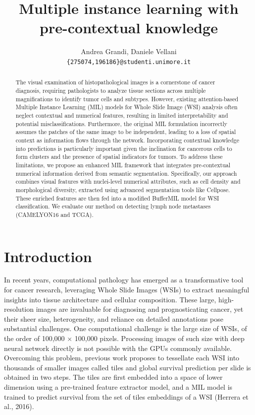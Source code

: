 \documentclass[10pt,twocolumn]{article}
\title{\textbf{Multiple instance learning with pre-contextual knowledge}}
\author{Andrea Grandi, Daniele Vellani \\
\texttt{\{275074,196186\}@studenti.unimore.it}}
\begin{document}
\maketitle

\begin{abstract}
\noindent 
The visual examination of histopathological images is a cornerstone of cancer diagnosis, requiring pathologists to analyze tissue sections across multiple magnifications to identify tumor cells and subtypes. However, existing attention-based Multiple Instance Learning (MIL) models for Whole Slide Image (WSI) analysis often neglect contextual and numerical features, resulting in limited interpretability and potential misclassifications. Furthermore, the original MIL formulation incorrectly assumes the patches of the same image to be independent, leading to a loss of spatial context as information flows through the network. Incorporating contextual knowledge into predictions is particularly important given the inclination for cancerous cells to form clusters and the presence of spatial indicators for tumors. To address these limitations, we propose an enhanced MIL framework that integrates pre-contextual numerical information derived from semantic segmentation. Specifically, our approach combines visual features with nuclei-level numerical attributes, such as cell density and morphological diversity, extracted using advanced segmentation tools like Cellpose. These enriched features are then fed into a modified BufferMIL model for WSI classification. We evaluate our method on detecting lymph node metastases (CAMELYON16 and TCGA).

\end{abstract}

\section{Introduction}
In recent years, computational pathology has emerged as a transformative tool for cancer research, leveraging Whole Slide Images (WSIs) to extract meaningful insights into tissue architecture and cellular composition. These large, high-resolution images are invaluable for diagnosing and prognosticating cancer, yet their sheer size, heterogeneity, and reliance on detailed annotations pose substantial challenges. One computational challenge is the large size of WSIs, of the order of 100,000 $\times$ 100,000 pixels. Processing images of such size with deep neural network directly is not possible with the GPUs commonly available. Overcoming this problem, previous work proposes to tessellate each WSI into thousands of smaller images called tiles and global survival prediction per slide is obtained in two steps. The tiles are first embedded into a space of lower dimension using a pre-trained feature extractor model, and a MIL model is trained to predict survival from the set of tiles embeddings of a WSI (Herrera et al., 2016)\cite{8507932}. 
\end{document}
